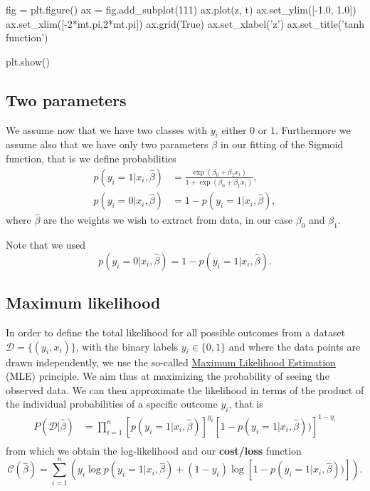 \documentclass[%
oneside,                 %
final,                   %
10pt]{article}
\begin{document}
fig = plt.figure()
ax = fig.add_subplot(111)
ax.plot(z, t)
ax.set_ylim([-1.0, 1.0])
ax.set_xlim([-2*mt.pi,2*mt.pi])
ax.grid(True)
ax.set_xlabel('z')
ax.set_title('tanh function')

plt.show()
\epycod







\subsection{Two parameters}

We assume now that we have two classes with $y_i$ either $0$ or $1$. Furthermore we assume also that we have only two parameters $\beta$ in our fitting of the Sigmoid function, that is we define probabilities 
\begin{align*}
p(y_i=1|x_i,\hat{\beta}) &= \frac{\exp{(\beta_0+\beta_1x_i)}}{1+\exp{(\beta_0+\beta_1x_i)}},\nonumber\\
p(y_i=0|x_i,\hat{\beta}) &= 1 - p(y_i=1|x_i,\hat{\beta}),
\end{align*}
where $\hat{\beta}$ are the weights we wish to extract from data, in our case $\beta_0$ and $\beta_1$. 

Note that we used
\[
p(y_i=0\vert x_i, \hat{\beta}) = 1-p(y_i=1\vert x_i, \hat{\beta}).
\]

\subsection{Maximum likelihood}

In order to define the total likelihood for all possible outcomes from a  
dataset $\mathcal{D}=\{(y_i,x_i)\}$, with the binary labels
$y_i\in\{0,1\}$ and where the data points are drawn independently, we use the so-called \href{{https://en.wikipedia.org/wiki/Maximum_likelihood_estimation}}{Maximum Likelihood Estimation} (MLE) principle. 
We aim thus at maximizing 
the probability of seeing the observed data. We can then approximate the 
likelihood in terms of the product of the individual probabilities of a specific outcome $y_i$, that is 
\begin{align*}
P(\mathcal{D}|\hat{\beta})& = \prod_{i=1}^n \left[p(y_i=1|x_i,\hat{\beta})\right]^{y_i}\left[1-p(y_i=1|x_i,\hat{\beta}))\right]^{1-y_i}\nonumber \\
\end{align*}
from which we obtain the log-likelihood and our \textbf{cost/loss} function
\[
\mathcal{C}(\hat{\beta}) = \sum_{i=1}^n \left( y_i\log{p(y_i=1|x_i,\hat{\beta})} + (1-y_i)\log\left[1-p(y_i=1|x_i,\hat{\beta}))\right]\right).
\]
\end{document}
